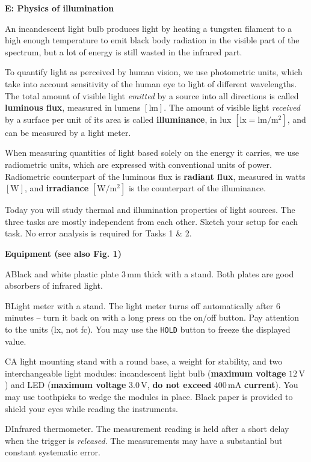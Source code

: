 {\large\textbf{E: Physics of illumination}}

An incandescent light bulb produces light by heating a tungsten filament to a
high enough temperature to emit black body radiation in the visible part of the
spectrum, but a lot of energy is still wasted in the infrared part.

To quantify light as perceived by human vision, we use photometric units, which
take into account sensitivity of the human eye to light of different
wavelengths. The total amount of visible light \textit{emitted} by a source into
all directions is called \textbf{luminous flux}, measured in lumens
$[\mathrm{lm}]$. The amount of visible light \textit{received} by a surface per
unit of its area is called \textbf{illuminance}, in lux
$[\mathrm{lx} = \mathrm{lm/m^2}]$, and can be measured by a light meter.

When measuring quantities of light based solely on the energy it carries, we
use radiometric units, which are expressed with conventional units of power.
Radiometric counterpart of the luminous flux is \textbf{radiant flux}, measured
in watts $[\mathrm{W}]$, and \textbf{irradiance} $[\mathrm{W/m^2}]$ is the
counterpart of the illuminance.

Today you will study thermal and illumination properties of light sources. The
three tasks are mostly independent from each other. Sketch your setup for each
task. No error analysis is required for Tasks 1 \& 2.

\textbf{Equipment (see also Fig. 1)}

A\quad Black and white plastic plate $3\,\mathrm{mm}$ thick with a stand. Both
plates are good absorbers of infrared light.

B\quad Light meter with a stand. The light meter turns off automatically after
6 minutes -- turn it back on with a long press on the on/off button. Pay
attention to the units (lx, not fc). You may use the \texttt{HOLD} button to
freeze the displayed value.

C\quad A light mounting stand with a round base, a weight for stability, and two
interchangeable light modules: incandescent light bulb (\textbf{maximum
voltage} $12\,\mathrm{V}$) and LED (\textbf{maximum voltage}
$3.0\,\mathrm{V}$, \textbf{do not exceed} $400\,\mathrm{mA}$
\textbf{current}). You may use toothpicks to wedge the modules in place. Black
paper is provided to shield your eyes while reading the instruments.

D\quad Infrared thermometer. The measurement reading is held after a short
delay when the trigger is \textit{released}. The measurements may have a
substantial but constant systematic error.

